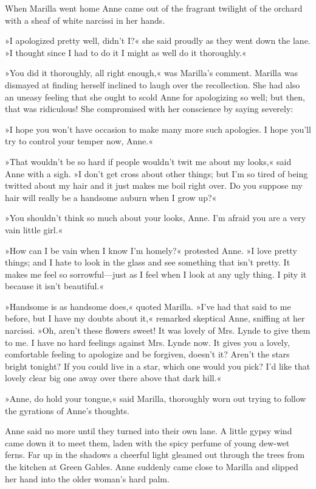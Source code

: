 When Marilla went home Anne came out of the fragrant twilight of the orchard with a sheaf of white narcissi in her hands.

»I apologized pretty well, didn’t I?« she said proudly as they went down the lane. »I thought since I had to do it I might as well do it thoroughly.«

»You did it thoroughly, all right enough,« was Marilla’s comment. Marilla was dismayed at finding herself inclined to laugh over the recollection. She had also an uneasy feeling that she ought to scold Anne for apologizing so well; but then, that was ridiculous! She compromised with her conscience by saying severely:

»I hope you won’t have occasion to make many more such apologies. I hope you’ll try to control your temper now, Anne.«

»That wouldn’t be so hard if people wouldn’t twit me about my looks,« said Anne with a sigh. »I don’t get cross about other things; but I’m so tired of being twitted about my hair and it just makes me boil right over. Do you suppose my hair will really be a handsome auburn when I grow up?«

»You shouldn’t think so much about your looks, Anne. I’m afraid you are a very vain little girl.«

»How can I be vain when I know I’m homely?« protested Anne. »I love pretty things; and I hate to look in the glass and see something that isn’t pretty. It makes me feel so sorrowful—just as I feel when I look at any ugly thing. I pity it because it isn’t beautiful.«

»Handsome is as handsome does,« quoted Marilla. »I’ve had that said to me before, but I have my doubts about it,« remarked skeptical Anne, sniffing at her narcissi. »Oh, aren’t these flowers sweet! It was lovely of Mrs. Lynde to give them to me. I have no hard feelings against Mrs. Lynde now. It gives you a lovely, comfortable feeling to apologize and be forgiven, doesn’t it? Aren’t the stars bright tonight? If you could live in a star, which one would you pick? I’d like that lovely clear big one away over there above that dark hill.«

»Anne, do hold your tongue,« said Marilla, thoroughly worn out trying to follow the gyrations of Anne’s thoughts.

Anne said no more until they turned into their own lane. A little gypsy wind came down it to meet them, laden with the spicy perfume of young dew-wet ferns. Far up in the shadows a cheerful light gleamed out through the trees from the kitchen at Green Gables. Anne suddenly came close to Marilla and slipped her hand into the older woman’s hard palm.

